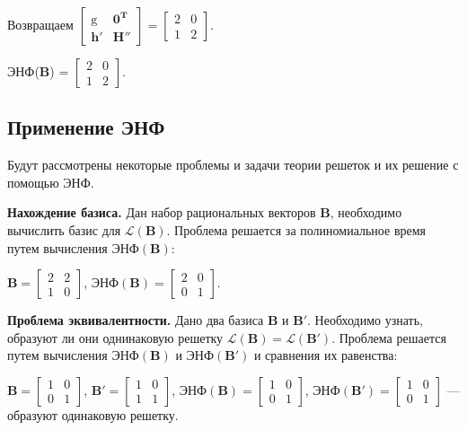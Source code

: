 \begin{enumerate}
Возвращаем $ \left[\begin{array}{cccc}
\mathrm{g} & \mathbf{0}^\mathbf{T} \\
\mathbf{h}' & \mathbf{H}''
\end{array}\right] = \left[\begin{array}{cccc}
2 & 0 \\
1 & 2
\end{array}\right] $.
\end{enumerate}

ЭНФ($ \mathbf{B} $) = $ \left[\begin{array}{cccc}
2 & 0 \\
1 & 2
\end{array}\right] $.

\subsection{Применение ЭНФ}

Будут рассмотрены некоторые проблемы и задачи теории решеток и их решение с помощью ЭНФ\cite{lec4}.

\textbf{Нахождение базиса.} Дан набор рациональных векторов $ \mathbf{B} $, необходимо вычислить базис для $ \mathcal{L}(\mathbf{B}) $. Проблема решается за полиномиальное время путем вычисления $ \text{ЭНФ}(\mathbf{B}) $: 

$ \mathbf{B} = \left[\begin{array}{cccc}
2 & 2 \\
1 & 0
\end{array}\right] $, 
$ \text{ЭНФ}(\mathbf{B}) = \left[\begin{array}{cccc}
2 & 0 \\
0 & 1
\end{array}\right] $.

\textbf{Проблема эквивалентности.} Дано два базиса $ \mathbf{B} $ и $ \mathbf{B}' $. Необходимо узнать, образуют ли они однинаковую решетку $ \mathcal{L}(\mathbf{B}) = \mathcal{L}(\mathbf{B}') $. Проблема решается путем вычисления $ \text{ЭНФ}(\mathbf{B}) $ и $ \text{ЭНФ}(\mathbf{B}') $ и сравнения их равенства:

$ \mathbf{B} = \left[\begin{array}{cccc}
1 & 0 \\
0 & 1
\end{array}\right] $, 
$ \mathbf{B}' = \left[\begin{array}{cccc}
1 & 0 \\
1 & 1
\end{array}\right] $, 
$ \text{ЭНФ}(\mathbf{B}) = \left[\begin{array}{cccc}
1 & 0 \\
0 & 1
\end{array}\right] $,
$ \text{ЭНФ}(\mathbf{B}') = \left[\begin{array}{cccc}
1 & 0 \\
0 & 1
\end{array}\right] $ --- образуют одинаковую решетку.

